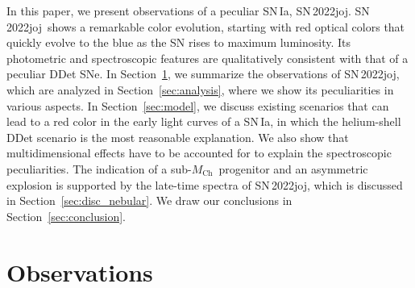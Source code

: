 \documentclass[twocolumn]{aastex631}
\newcommand{\sn}{SN\,2022joj}
\newcommand{\Mch}{$M_\mathrm{Ch}$}
\newcommand{\chang}[1]{\textcolor{blue}{[Chang: #1]}}
\begin{document}
\begin{CJK*}{UTF8}{gbsn}
In this paper, we present observations of a peculiar SN\,Ia, \sn. \sn\ shows a remarkable color evolution, starting with red optical colors that quickly evolve to the blue as the SN rises to maximum luminosity. Its photometric and spectroscopic features are qualitatively consistent with that of a peculiar DDet SNe. In Section~\ref{sec:obs}, we summarize the observations of \sn, which are analyzed in Section~\ref{sec:analysis}, where we show its peculiarities in various aspects. In Section~\ref{sec:model}, we discuss existing scenarios that can lead to a red color in the early light curves of a SN\,Ia, in which the helium-shell DDet scenario is the most reasonable explanation. We also show that multidimensional effects have to be accounted for to explain the spectroscopic peculiarities. 
The indication of a sub-\Mch\ progenitor and an asymmetric explosion is supported by the late-time spectra of \sn, which is discussed in Section~\ref{sec:disc_nebular}. We draw our conclusions in Section~\ref{sec:conclusion}.


\section{Observations} \label{sec:obs}

\end{CJK*}
\end{document}

